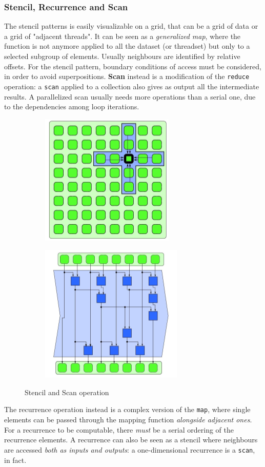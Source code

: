 \documentclass{article}
\begin{document}
			\subsubsection{Stencil, Recurrence and Scan}
				The stencil patterns is easily visualizable on a grid, that can be a grid of data or a grid of "adjacent threads". It can be seen as a \textit{generalized map}, where the function is not anymore applied to all the dataset (or threadset) but only to a selected subgroup of elements. Usually neighbours are identified by relative offsets. For the stencil pattern, boundary conditions of access must be considered, in order to avoid superpositions. \textbf{Scan} instead is a modification of the \verb|reduce| operation: a \verb|scan| applied to a collection also gives as output all the intermediate results. A parallelized scan usually needs more operations than a serial one, due to the dependencies among loop iterations.
				\begin{figure}[H]
					\centering
					\begin{subfigure}{0.5\textwidth}
						\centering
						\includegraphics[width = 0.4\linewidth]{./images/Stencil.png}
					\end{subfigure}%
					\begin{subfigure}{0.5\textwidth}
						\centering
						\includegraphics[width = 0.4\linewidth]{./images/Scan.png}
					\end{subfigure}
					\caption{Stencil and Scan operation}
				\end{figure}
				The recurrence operation instead is a complex version of the \verb|map|, where single elements can be passed through the mapping function \textit{alongside adjacent ones}. For a recurrence to be computable, there \textit{must} be a serial ordering of the recurrence elements. A recurrence can also be seen as a stencil where neighbours are accessed \textit{both as inputs and outputs}: a one-dimensional recurrence is a \verb|scan|, in fact.
\end{document}
